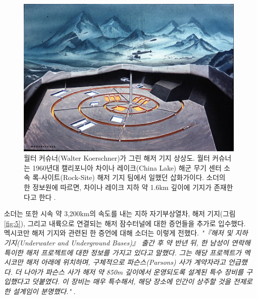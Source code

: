 \documentclass[10pt,twocolumn,letterpaper]{article}
\begin{document}
\begin{figure}[t]
\begin{center}
   \includegraphics[width=1\linewidth]{undersea.jpg}
\end{center}
   \caption{월터 커슈너(Walter Koerschner)가 그린 해저 기지 상상도. 월터 커슈너는 1960년대 캘리포니아 차이나 레이크(China Lake) 해군 무기 센터 소속 록-사이트(Rock-Site) 해저 기지 팀에서 일했던 삽화가이다. 소더의 한 정보원에 따르면, 차이나 레이크 지하 약 1.6km 깊이에 기지가 존재한다고 한다 \cite{22,23}.}
\label{fig:5}
\label{fig:onecol}
\end{figure}

소더는 또한 시속 약 3,200km의 속도를 내는 지하 자기부상열차, 해저 기지(그림 \ref{fig:5}), 그리고 내륙으로 연결되는 해저 잠수터널에 대한 증언들을 추가로 입수했다. 멕시코만 해저 기지와 관련된 한 증언에 대해 소더는 이렇게 전했다. \textit{"『해저 및 지하 기지(Underwater and Underground Bases)』 출간 후 약 반년 뒤, 한 남성이 연락해 특이한 해저 프로젝트에 대한 정보를 가지고 있다고 말했다. 그는 해당 프로젝트가 멕시코만 해저 아래에 위치하며, 구체적으로 파슨스(Parsons) 사가 계약자라고 언급했다. 더 나아가 파슨스 사가 해저 약 850m 깊이에서 운영되도록 설계된 특수 장비를 구입했다고 덧붙였다. 이 장비는 매우 특수해서, 해당 장소에 인간이 상주할 것을 전제로 한 설계임이 분명했다."} \cite{22}.
\end{document}
